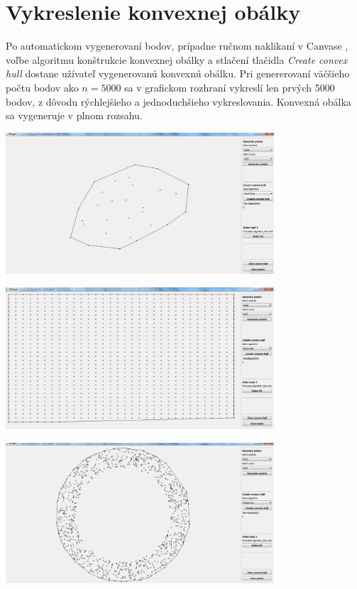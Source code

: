 \documentclass[12pt]{article}
\begin{document}
\clearpage 
\section{Vykreslenie konvexnej obálky}
Po automatickom vygenerovaní bodov, prípadne ručnom naklikaní v Canvase , voľbe algoritmu konštrukcie konvexnej obálky a stlačení tlačidla \textit{Create convex hull} dostane užívateľ vygenerovanú konvexnú obálku. Pri genererovaní väčšieho počtu bodov ako $ n = 5000 $ sa v grafickom rozhraní vykreslí len prvých 5000 bodov, z dôvodu rýchlejšieho a jednoduchšieho vykreslovania. Konvexná obálka sa vygeneruje v plnom rozsahu.
 
\begin{center}
   \includegraphics[width=10cm]{./img/CH_points_manual.png}
\end{center}

\begin{center}
   \includegraphics[width=10cm]{./img/CH_points_generate_grid_1000.png}
\end{center}

\begin{center}
   \includegraphics[width=10cm]{./img/CH_points_generate_circle_1000.png}
\end{center}
\end{document}
